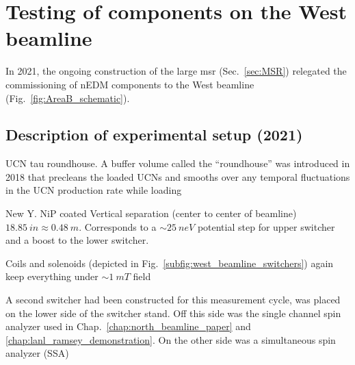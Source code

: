 
\chapter{Testing of components on the West beamline}\label{chap:fall2021}


In 2021, the ongoing construction of the large \acrshort{msr} (Sec.~\ref{sec:MSR}) relegated the commissioning of nEDM components to the West beamline (Fig.~\ref{fig:AreaB_schematic}).


\section{Description of experimental setup (2021)}


UCN tau roundhouse. A buffer volume called the ``roundhouse'' was introduced in 2018 that precleans the loaded UCNs and smooths over any temporal fluctuations in the UCN production rate while loading

New Y. NiP coated Vertical separation (center to center of beamline) $\qty{18.85}{in}\approx\qty{0.48}{m}$. Corresponds to a $\sim \qty{25}{neV}$ potential step for upper switcher and a boost to the lower switcher. 

Coils and solenoids (depicted in Fig.~\ref{subfig:west_beamline_switchers}) again keep everything under $\sim \qty{1}{mT}$ field

A second switcher had been constructed for this measurement cycle, was placed on the lower side of the switcher stand. Off this side was the single channel spin analyzer used in Chap.~\ref{chap:north_beamline_paper} and \ref{chap:lanl_ramsey_demonstration}. On the other side was a simultaneous spin analyzer (SSA)

